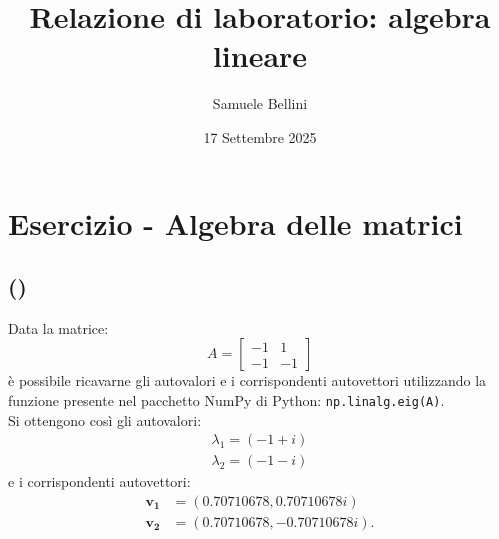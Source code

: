 \documentclass[a4paper]{article}
\newcounter{count_es}
\newcounter{count_sub_es}[count_es]
\begin{document}
\title{Relazione di laboratorio: algebra lineare}
\author{Samuele Bellini}
\date{17 Settembre 2025}
\maketitle

\section*{Esercizio  - Algebra delle matrici}

\subsection*{ ()}
Data la matrice:
\[A = \begin{bmatrix}
        -1 & 1 \\
        -1 & -1 
    \end{bmatrix}\]
è possibile ricavarne gli autovalori e i corrispondenti 
autovettori utilizzando la funzione presente nel  pacchetto 
NumPy di Python: \lstinline{np.linalg.eig(A)}. \\
Si ottengono così gli autovalori:
\begin{subequations}    
    \begin{align*}
        \lambda_{1} = (-1+i)\\
        \lambda_{2} = (-1-i)
    \end{align*}
\end{subequations}
e i corrispondenti autovettori:
\begin{subequations}    
    \begin{align*}
        \mathbf{v_{1}} &= (0.70710678, 0.70710678i)\\
        \mathbf{v_{2}} &= (0.70710678, -0.70710678i).
    \end{align*}
\end{subequations}
\end{document}
